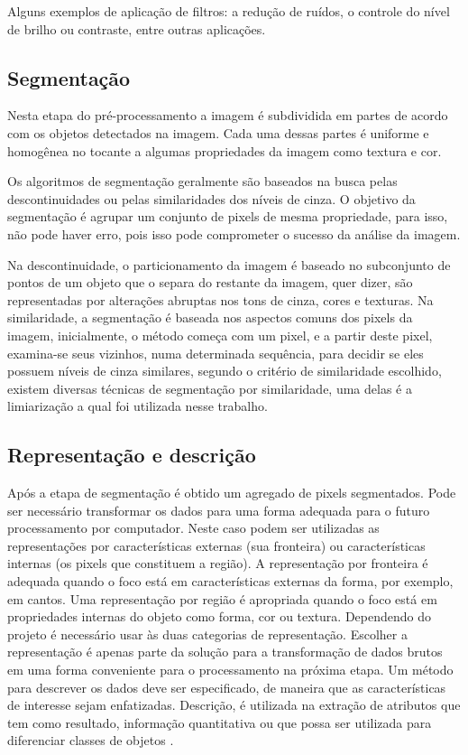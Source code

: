 Alguns exemplos de aplicação de filtros: a redução de ruídos, o controle do nível de brilho ou contraste, entre outras aplicações. 


\subsection{Segmentação}
\label{sub:segment}

Nesta etapa do pré-processamento a imagem é subdividida em partes de acordo com os objetos detectados na imagem. Cada uma dessas partes é uniforme e homogênea no tocante a algumas propriedades da imagem como textura e cor.

Os algoritmos de segmentação geralmente são baseados na busca pelas descontinuidades ou pelas similaridades dos níveis de cinza. \cite{digitalImgProcess2010} O objetivo da segmentação é agrupar um conjunto de pixels de mesma propriedade, para isso, não pode haver erro, pois isso pode comprometer o sucesso da análise da imagem.

Na descontinuidade, o particionamento da imagem é baseado no subconjunto de pontos de um objeto que o separa do restante da imagem, quer dizer, são representadas por alterações abruptas nos tons de cinza, cores e texturas. Na similaridade, a segmentação é baseada nos aspectos comuns dos pixels da imagem, inicialmente, o método começa com um pixel, e a partir deste pixel, examina-se seus vizinhos, numa determinada sequência, para decidir se eles possuem níveis de cinza similares, segundo o critério de similaridade escolhido, existem diversas técnicas de segmentação por similaridade,  uma delas é a limiarização a qual foi utilizada nesse trabalho.


\subsection{Representação e descrição}
\label{sub:rep-desc}

Após a etapa de segmentação é obtido um agregado de pixels segmentados. Pode ser necessário transformar os dados para uma forma adequada para o futuro processamento por computador. Neste caso podem ser utilizadas as representações por características externas (sua fronteira) ou características internas (os pixels que constituem a região). A representação por fronteira é adequada quando o foco está em características externas da forma,  por exemplo, em cantos. Uma representação por região é apropriada quando o foco está em propriedades internas do objeto como forma, cor ou textura. Dependendo do projeto é necessário usar às duas categorias de representação. Escolher a representação é apenas parte da solução para a transformação de dados brutos em uma forma conveniente para o processamento na próxima etapa. Um método para descrever os dados deve ser especificado, de maneira que as características de interesse sejam enfatizadas. Descrição, é utilizada na extração de atributos que tem como resultado, informação quantitativa ou que possa ser utilizada para diferenciar classes de objetos \cite{digitalImgProcess2010}.


